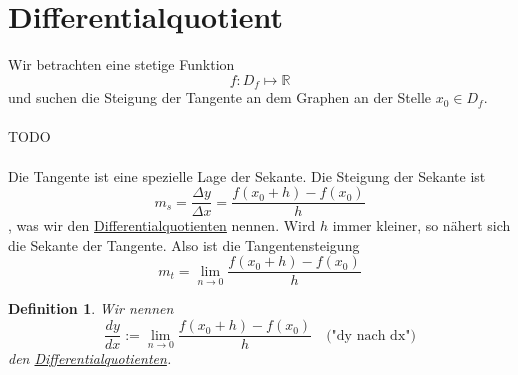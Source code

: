 \documentclass{report}
\newtheorem{mydef}{Definition}
\begin{document}
\section{Differentialquotient}
Wir betrachten eine stetige Funktion
\begin{equation}f: D_f \mapsto \mathbb{R}\end{equation}
und suchen die Steigung der Tangente an dem Graphen an der Stelle $x_0 \in D_f$.
\\\\TODO\\\\
Die Tangente ist eine spezielle Lage der Sekante. Die Steigung der Sekante ist
\begin{equation}m_s = \frac{\Delta y}{\Delta x} = \frac{f(x_0 + h) - f(x_0)}{h}\end{equation}
, was wir den \underline{Differentialquotienten} nennen. Wird $h$ immer kleiner, so nähert sich die Sekante der Tangente. Also ist die Tangentensteigung
\begin{equation}m_t = \lim_{n \to 0} \frac{f(x_0 + h) - f(x_0)}{h}\end{equation}
\begin{mydef}Wir nennen
\begin{equation}\frac{dy}{dx} := \lim_{n \to 0} \frac{f(x_0 + h) - f(x_0)}{h} \quad \mbox{("dy nach dx")}\end{equation}
den \underline{Differentialquotienten}.\end{mydef}
\end{document}
